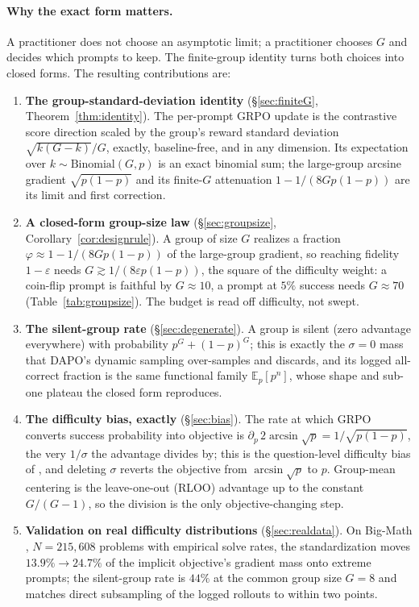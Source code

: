 \documentclass[11pt]{article}
\theoremstyle{plain}
\theoremstyle{definition}
\newcommand{\E}{\mathbb{E}}
\begin{document}
\paragraph{Why the exact form matters.} A practitioner does not choose an asymptotic limit; a practitioner chooses $G$ and decides which prompts to keep. The finite-group identity turns both choices into closed forms. The resulting contributions are:
\begin{enumerate}
\item \textbf{The group-standard-deviation identity} (\S\ref{sec:finiteG}, Theorem~\ref{thm:identity}). The per-prompt GRPO update is the contrastive score direction scaled by the group's reward standard deviation $\sqrt{k(G-k)}/G$, exactly, baseline-free, and in any dimension. Its expectation over $k\sim\mathrm{Binomial}(G,p)$ is an exact binomial sum; the large-group arcsine gradient $\sqrt{p(1-p)}$ and its finite-$G$ attenuation $1-1/(8Gp(1-p))$ are its limit and first correction.
\item \textbf{A closed-form group-size law} (\S\ref{sec:groupsize}, Corollary~\ref{cor:designrule}). A group of size $G$ realizes a fraction $\varphi\approx1-1/(8Gp(1-p))$ of the large-group gradient, so reaching fidelity $1-\varepsilon$ needs $G\gtrsim 1/(8\varepsilon p(1-p))$, the square of the difficulty weight: a coin-flip prompt is faithful by $G\approx10$, a prompt at $5\%$ success needs $G\approx70$ (Table~\ref{tab:groupsize}). The budget is read off difficulty, not swept.
\item \textbf{The silent-group rate} (\S\ref{sec:degenerate}). A group is silent (zero advantage everywhere) with probability $p^{G}+(1-p)^{G}$; this is exactly the $\sigma=0$ mass that DAPO's dynamic sampling \citep{yu2025dapo} over-samples and discards, and its logged all-correct fraction is the same functional family $\E_p[p^{n}]$, whose shape and sub-one plateau the closed form reproduces.
\item \textbf{The difficulty bias, exactly} (\S\ref{sec:bias}). The rate at which GRPO converts success probability into objective is $\partial_p\,2\arcsin\sqrt p=1/\sqrt{p(1-p)}$, the very $1/\sigma$ the advantage divides by; this is the question-level difficulty bias of \citet{liu2025drgrpo}, and deleting $\sigma$ reverts the objective from $\arcsin\sqrt p$ to $p$. Group-mean centering is the leave-one-out (RLOO) advantage up to the constant $G/(G-1)$, so the division is the only objective-changing step.
\item \textbf{Validation on real difficulty distributions} (\S\ref{sec:realdata}). On Big-Math \citep{albalak2025bigmath}, $N=215{,}608$ problems with empirical solve rates, the standardization moves $13.9\%\!\to\!24.7\%$ of the implicit objective's gradient mass onto extreme prompts; the silent-group rate is $44\%$ at the common group size $G=8$ and matches direct subsampling of the logged rollouts to within two points.

\end{enumerate}
\end{document}
